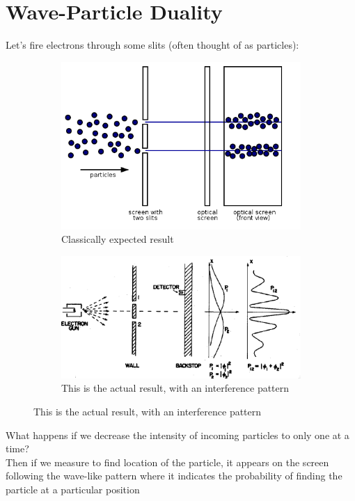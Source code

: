 \documentclass[a4paper, 11pt, fleqn, normalem]{report}
\begin{document}
\section{Wave-Particle Duality}
Let's fire electrons through some slits (often thought of as particles):
\begin{figure}[H]
    \begin{subfigure}{0.6\textwidth}
        \caption{Classically expected result}
        \includegraphics[width=\textwidth]{ClassicalDouble.png}
    \end{subfigure}

    \begin{subfigure}{0.8\textwidth}
        \caption{This is the actual result, with an interference pattern}
        \includegraphics[width=\textwidth]{ActualDouble.png}
    \end{subfigure}
\end{figure}
What happens if we decrease the intensity of incoming particles to only one at a time? \\
Then if we measure to find location of the particle, it appears on the screen following the wave-like pattern where it indicates the probability of finding the particle at a particular position
\end{document}
